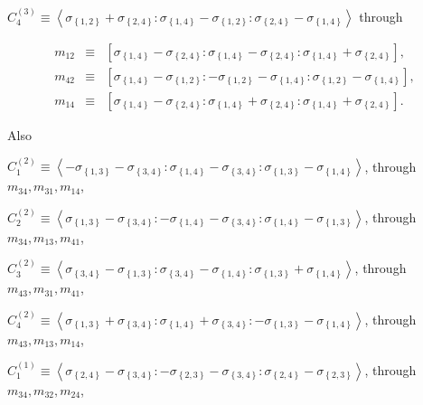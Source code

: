 \documentclass[11pt]{article}
\begin{document}
$C_{4}^{\left( 3\right) }\equiv \left\langle \sigma _{\left\{ 1,2\right\}
}+\sigma _{\left\{ 2,4\right\} }:\sigma _{\left\{ 1,4\right\} }-\sigma
_{\left\{ 1,2\right\} }:\sigma _{\left\{ 2,4\right\} }-\sigma _{\left\{
1,4\right\} }\right\rangle $ through

\begin{eqnarray*}
m_{12} &\equiv &\left[ \sigma _{\left\{ 1,4\right\} }-\sigma _{\left\{
2,4\right\} }:\sigma _{\left\{ 1,4\right\} }-\sigma _{\left\{ 2,4\right\}
}:\sigma _{\left\{ 1,4\right\} }+\sigma _{\left\{ 2,4\right\} }\right] , \\
m_{42} &\equiv &\left[ \sigma _{\left\{ 1,4\right\} }-\sigma _{\left\{
1,2\right\} }:-\sigma _{\left\{ 1,2\right\} }-\sigma _{\left\{ 1,4\right\}
}:\sigma _{\left\{ 1,2\right\} }-\sigma _{\left\{ 1,4\right\} }\right] , \\
m_{14} &\equiv &\left[ \sigma _{\left\{ 1,4\right\} }-\sigma _{\left\{
2,4\right\} }:\sigma _{\left\{ 1,4\right\} }+\sigma _{\left\{ 2,4\right\}
}:\sigma _{\left\{ 1,4\right\} }+\sigma _{\left\{ 2,4\right\} }\right] .
\end{eqnarray*}

Also

$C_{1}^{\left( 2\right) }\equiv \left\langle -\sigma _{\left\{ 1,3\right\}
}-\sigma _{\left\{ 3,4\right\} }:\sigma _{\left\{ 1,4\right\} }-\sigma
_{\left\{ 3,4\right\} }:\sigma _{\left\{ 1,3\right\} }-\sigma _{\left\{
1,4\right\} }\right\rangle $, through $m_{34},m_{31},m_{14}$,

$C_{2}^{\left( 2\right) }\equiv \left\langle \sigma _{\left\{ 1,3\right\}
}-\sigma _{\left\{ 3,4\right\} }:-\sigma _{\left\{ 1,4\right\} }-\sigma
_{\left\{ 3,4\right\} }:\sigma _{\left\{ 1,4\right\} }-\sigma _{\left\{
1,3\right\} }\right\rangle $, through $m_{34},m_{13},m_{41}$,

$C_{3}^{\left( 2\right) }\equiv \left\langle \sigma _{\left\{ 3,4\right\}
}-\sigma _{\left\{ 1,3\right\} }:\sigma _{\left\{ 3,4\right\} }-\sigma
_{\left\{ 1,4\right\} }:\sigma _{\left\{ 1,3\right\} }+\sigma _{\left\{
1,4\right\} }\right\rangle $, through $m_{43},m_{31},m_{41}$,

$C_{4}^{\left( 2\right) }\equiv \left\langle \sigma _{\left\{ 1,3\right\}
}+\sigma _{\left\{ 3,4\right\} }:\sigma _{\left\{ 1,4\right\} }+\sigma
_{\left\{ 3,4\right\} }:-\sigma _{\left\{ 1,3\right\} }-\sigma _{\left\{
1,4\right\} }\right\rangle $, through $m_{43},m_{13},m_{14}$,

$C_{1}^{\left( 1\right) }\equiv \left\langle \sigma _{\left\{ 2,4\right\}
}-\sigma _{\left\{ 3,4\right\} }:-\sigma _{\left\{ 2,3\right\} }-\sigma
_{\left\{ 3,4\right\} }:\sigma _{\left\{ 2,4\right\} }-\sigma _{\left\{
2,3\right\} }\right\rangle $, through $m_{34},m_{32},m_{24}$,
\end{document}
